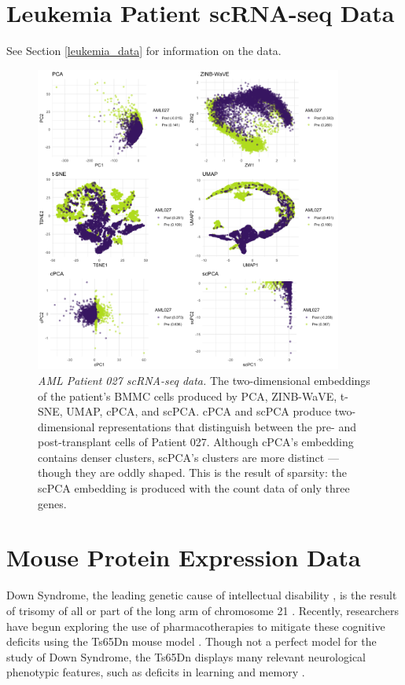 \FloatBarrier

\section{Leukemia Patient scRNA-seq Data}

See Section \ref{leukemia_data} for information on the data.

\begin{figure}[!htbp]
  \centering
  \includegraphics[width=0.9\textwidth]{figures/aml027_results.png}
  \caption{{\em AML Patient 027 scRNA-seq data.} The two-dimensional embeddings of the patient's BMMC cells produced by PCA, ZINB-WaVE, t-SNE, UMAP, cPCA, and scPCA. cPCA and scPCA produce two-dimensional representations that distinguish between the pre- and post-transplant cells of Patient 027. Although cPCA's embedding contains denser clusters, scPCA's clusters are more distinct --- though they are oddly shaped. This is the result of sparsity: the scPCA embedding is produced with the count data of only three genes.}
  \label{fig:comp_leuk_pat2}
\end{figure}
\FloatBarrier

\section{Mouse Protein Expression Data}\label{sup_mice}

Down Syndrome, the leading genetic cause of intellectual disability \cite{Irving2008}, is the result of trisomy of all or part of the long arm of chromosome 21 \cite{Ahmed2015}. Recently, researchers have begun exploring the use of pharmacotherapies to mitigate these cognitive deficits using the Ts65Dn mouse model \cite{Ahmed2015,Higuera2015}. Though not a perfect model for the study of Down Syndrome, the Ts65Dn displays many relevant neurological phenotypic features, such as deficits in learning and memory \cite{Rueda2012}.

